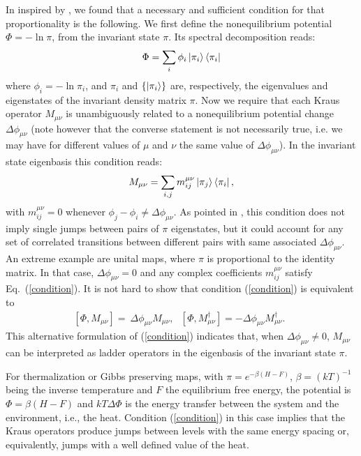\documentclass[aps,prx,twocolumn,showpacs,floatfix,superscriptaddress,graphics,longbibliography]{revtex4-1}
\newcommand{\HAT}{}
\begin{document}
In \cite{MHP} inspired by \cite{Fagnola:2007hj}, we found that a necessary and sufficient condition for that proportionality is the following. 
We first define the nonequilibrium potential $\HAT{\Phi} = - \ln \pi$, from the invariant state $\pi$. Its spectral decomposition reads:
\begin{equation}\label{noneqpotdecomposition}
\HAT{\Phi} =\sum_i \phi_i \ket{\pi_i}\bra{\pi_i} 
\end{equation}
where $\phi_i=-\ln \pi_i$, and $\pi_i$ and $\{\ket{\pi_i}\}$ are, respectively, the eigenvalues and eigenstates of the invariant density matrix $\pi$.
Now we require that each Kraus operator $\HAT{M}_{\mu \nu}$ is unambiguously related to a nonequilibrium potential change $\Delta \phi_{\mu \nu}$ (note 
however that the converse statement is not necessarily true, i.e. we may have for different values of $\mu$ and $\nu$ the same value of $\Delta \phi_{\mu \nu}$). In the invariant state eigenbasis this condition reads:
\begin{equation}\label{condition}
 \HAT{M}_{\mu \nu} = \sum_{i, j} m_{i j}^{\mu \nu} \ket{\pi_j} \bra{\pi_i},
\end{equation}
with $m_{i j}^{\mu \nu} = 0$ whenever $\phi_j - \phi_i \neq \Delta \phi_{\mu \nu}$.
As pointed in \cite{MHP}, this condition does not imply single jumps between pairs of $\pi$ eigenstates, but it could account for any set of correlated transitions between different pairs with 
same associated $\Delta \phi_{\mu \nu}$. An extreme example are unital maps, where $\pi$ is proportional to the identity matrix. 
In that case, $\Delta\phi_{\mu\nu}=0$ and any complex coefficients $m_{ij}^{\mu\nu}$ satisfy Eq.~(\ref{condition}).
It is not hard to show that condition (\ref{condition}) is equivalent to \cite{MHP}
\begin{eqnarray} \label{condition2}
[\HAT{\Phi}, \HAT{M}_{\mu \nu} ] = ~\Delta \phi_{\mu \nu} \HAT{M}_{\mu \nu}, ~~~ [\HAT{\Phi}, \HAT{M}_{\mu \nu}^\dagger ] = - \Delta \phi_{\mu \nu} \HAT{M}_{\mu \nu}^\dagger.~~
\end{eqnarray} 
This alternative formulation of  (\ref{condition}) indicates that, when $\Delta\phi_{\mu \nu}\neq 0$, $\HAT{M}_{\mu \nu}$ can be interpreted as ladder operators in the eigenbasis of the invariant state $\pi$.

For thermalization or Gibbs preserving  maps, with $\pi =e^{-\beta (H-F)}$, $\beta=(kT)^{-1}$ being the inverse temperature and $F$ the equilibrium free energy, the potential is $\HAT{\Phi}= \beta (H -F)$ and $kT\Delta\Phi$ 
is the energy transfer between the system and the environment, i.e., the heat. Condition (\ref{condition}) in this case implies that the Kraus operators produce jumps between levels with the same 
energy spacing or, equivalently, jumps  with a well defined value of the heat.
 
\end{document}
